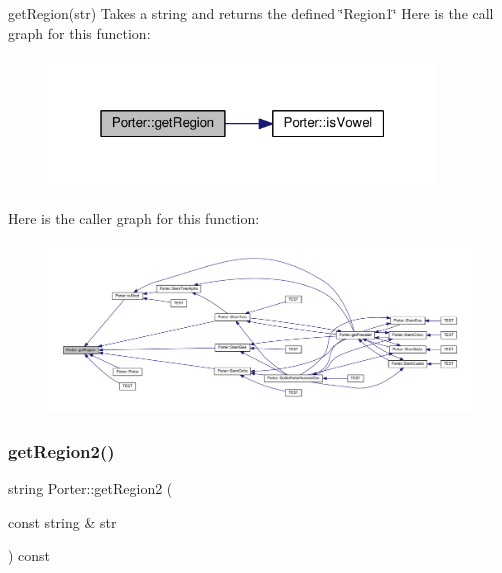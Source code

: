 get\+Region(str) Takes a string and returns the defined \char`\"{}\+Region1\char`\"{} Here is the call graph for this function\+:
\nopagebreak
\begin{figure}[H]
\begin{center}
\leavevmode
\includegraphics[width=292pt]{class_porter_a9e33d06b477f04db7c8cee07e85e8bcb_cgraph}
\end{center}
\end{figure}
Here is the caller graph for this function\+:
\nopagebreak
\begin{figure}[H]
\begin{center}
\leavevmode
\includegraphics[width=350pt]{class_porter_a9e33d06b477f04db7c8cee07e85e8bcb_icgraph}
\end{center}
\end{figure}
\mbox{\label{class_porter_a1420c413bb564a22e4fc0c6627e1870b}} 
\subsubsection{\texorpdfstring{get\+Region2()}{getRegion2()}}
{\footnotesize\ttfamily string Porter\+::get\+Region2 (\begin{DoxyParamCaption}\item[{const string \&}]{str }\end{DoxyParamCaption}) const}


